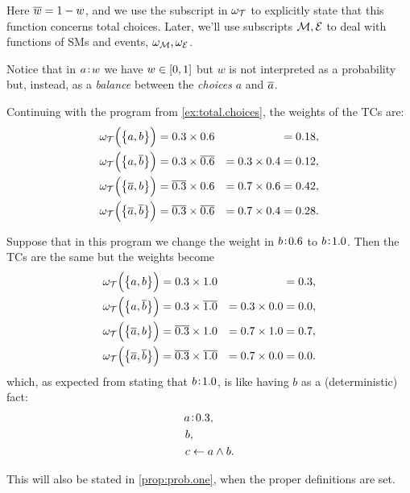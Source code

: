 \documentclass[x11names]{tlp}
\begin{document}
Here $\overline{w} = 1 - w$, and we use the subscript in $\wgtT$ to explicitly state that this function concerns total choices.
Later, we'll use subscripts $\MODELset, \EVENTSset$ to deal with functions of \aclp{SM} and events, $\wgtM, \wgtE$.

Notice that in $a\!:\!w$ we have $w\in \intcc{0,1}$ but $w$ is not interpreted as a probability but, instead, as a \emph{balance} between the \emph{choices} $a$ and $\overline{a}$.

\ifExamples
	\begin{example}%
		\label{ex:weight.total.choices}
		\em

		Continuing with the program from \cref{ex:total.choices}, the weights of the \aclp{TC} are:
		\begin{equation*}
			\begin{aligned}
				\wgtT\at{\set[1]{a, b}}           & = 0.3 \times 0.6           &                  & = 0.18, %
				\\
				\wgtT\at{\set[1]{a, \co{b}}}      & = 0.3 \times \co{0.6}      & = 0.3 \times 0.4 & = 0.12, %
				\\
				\wgtT\at{\set[1]{\co{a}, b}}      & = \co{0.3} \times 0.6      & = 0.7 \times 0.6 & = 0.42, %
				\\
				\wgtT\at{\set[1]{\co{a}, \co{b}}} & = \co{0.3} \times \co{0.6} & = 0.7 \times 0.4 & = 0.28.
			\end{aligned}
		\end{equation*}

		Suppose that in this program we change the weight in $b\!:\!0.6$
		to $b\!:\!1.0$.
		Then the \aclp{TC} are the same but the weights become
		\begin{equation*}
			\begin{aligned}
				\wgtT\at{\set[1]{a, b}}           & = 0.3 \times 1.0           &                  & = 0.3, %
				\\
				\wgtT\at{\set[1]{a, \co{b}}}      & = 0.3 \times \co{1.0}      & = 0.3 \times 0.0 & = 0.0, %
				\\
				\wgtT\at{\set[1]{\co{a}, b}}      & = \co{0.3} \times 1.0      & = 0.7 \times 1.0 & = 0.7, %
				\\
				\wgtT\at{\set[1]{\co{a}, \co{b}}} & = \co{0.3} \times \co{1.0} & = 0.7 \times 0.0 & = 0.0.
			\end{aligned}
		\end{equation*}
		which, as expected from stating that $b\!:\!1.0$, is like having $b$ as a (deterministic) fact:
		\begin{equation*}
			\begin{split}
				\weightfact{a & }{0.3},             %
				\\
				b           & ,                   %
				\\
				c           & \clause a \wedge b.
			\end{split}
		\end{equation*}

		This will also be stated in \cref{prop:prob.one}, when the proper definitions
		are set.
	\end{example}
\end{document}
